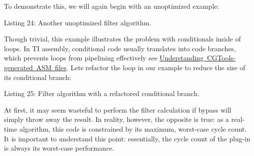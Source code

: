 To demonstrate this, we will again begin with an unoptimized example\+:


\begin{DoxyCode}{0}
\DoxyCodeLine{\{}
\DoxyCodeLine{    \{}
\DoxyCodeLine{    \}}
\DoxyCodeLine{    \textcolor{keywordflow}{else}}
\DoxyCodeLine{    \{}
\DoxyCodeLine{    \}}
\DoxyCodeLine{\} }
\end{DoxyCode}
  Listing 24\+: Another unoptimized filter algorithm.

Though trivial, this example illustrates the problem with conditionals inside of loops. In TI assembly, conditional code usually translates into code branches, which prevents loops from pipelining effectively see \mbox{\hyperlink{a00832_subsection__understanding_cgtoolsgenerated_asm_files}{Understanding C\+G\+Tools-\/generated A\+SM files}}. Let\textquotesingle{}s refactor the loop in our example to reduce the size of its conditional branch\+:


\begin{DoxyCode}{0}
\DoxyCodeLine{\{}
\DoxyCodeLine{}
\DoxyCodeLine{    \{}
\DoxyCodeLine{    \}}
\DoxyCodeLine{\} }
\end{DoxyCode}
  Listing 25\+: Filter algorithm with a refactored conditional branch.

At first, it may seem wasteful to perform the filter calculation if {\ttfamily bypass} will simply throw away the result. In reality, however, the opposite is true\+: as a real-\/time algorithm, this code is constrained by its maximum, worst-\/case cycle count. It is important to understand this point\+: essentially, the cycle count of the plug-\/in is always its worst-\/case performance.

